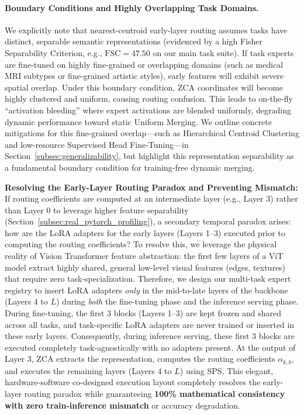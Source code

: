 \paragraph{Boundary Conditions and Highly Overlapping Task Domains.} We explicitly note that nearest-centroid early-layer routing assumes tasks have distinct, separable semantic representations (evidenced by a high Fisher Separability Criterion, e.g., $\text{FSC} = 47.50$ on our main task suite). If task experts are fine-tuned on highly fine-grained or overlapping domains (such as medical MRI subtypes or fine-grained artistic styles), early features will exhibit severe spatial overlap. Under this boundary condition, ZCA coordinates will become highly clustered and uniform, causing routing confusion. This leads to on-the-fly ``activation bleeding'' where expert activations are blended uniformly, degrading dynamic performance toward static Uniform Merging. We outline concrete mitigations for this fine-grained overlap---such as Hierarchical Centroid Clustering and low-resource Supervised Head Fine-Tuning---in Section~\ref{subsec:generalizability}, but highlight this representation separability as a fundamental boundary condition for training-free dynamic merging.

\textbf{Resolving the Early-Layer Routing Paradox and Preventing Mismatch:}
If routing coefficients are computed at an intermediate layer (e.g., Layer 3) rather than Layer 0 to leverage higher feature separability (Section~\ref{subsec:real_pytorch_profiling}), a secondary temporal paradox arises: how are the LoRA adapters for the early layers (Layers 1--3) executed prior to computing the routing coefficients?
To resolve this, we leverage the physical reality of Vision Transformer feature abstraction: the first few layers of a ViT model extract highly shared, general low-level visual features (edges, textures) that require zero task-specialization.
Therefore, we design our multi-task expert registry to insert LoRA adapters \emph{only} in the mid-to-late layers of the backbone (Layers 4 to $L$) during \emph{both} the fine-tuning phase and the inference serving phase. During fine-tuning, the first 3 blocks (Layers 1--3) are kept frozen and shared across all tasks, and task-specific LoRA adapters are never trained or inserted in these early layers. Consequently, during inference serving, these first 3 blocks are executed completely task-agnostically with no adapters present. At the output of Layer 3, ZCA extracts the representation, computes the routing coefficients $\alpha_{k, b}$, and executes the remaining layers (Layers 4 to $L$) using SPS. This elegant, hardware-software co-designed execution layout completely resolves the early-layer routing paradox while guaranteeing \textbf{100\% mathematical consistency with zero train-inference mismatch} or accuracy degradation.

